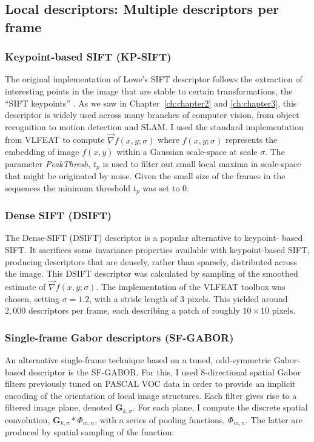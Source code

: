 \subsection{Local descriptors: Multiple descriptors per frame}
\label{sec:descriptors}

\subsubsection{Keypoint-based SIFT (KP-SIFT)}

The original implementation of Lowe's SIFT descriptor follows the extraction of interesting points in the image that are stable to certain transformations, the ``SIFT keypoints'' \cite{lowe2004distinctive}. As we saw in Chapter~\ref{ch:chapter2} and \ref{ch:chapter3}, this descriptor is widely used across many branches of computer vision, from object recognition to motion detection and SLAM. I used the standard implementation from VLFEAT \cite{Vedaldi2008} to compute $\vec{\nabla}f(x,y;\sigma)$ where $f(x,y;\sigma)$ represents the embedding of image $f(x,y)$ within a Gaussian scale-space at scale $\sigma$. The parameter \emph{PeakThresh}, $t_p$ is used to filter out small local maxima in scale-space that might be originated by noise. Given the small size of the frames in the sequences the minimum threshold $t_p$ was set to $0$.

\subsubsection{Dense SIFT (DSIFT)}

The Dense-SIFT (DSIFT) descriptor \citep{Lazebnik2006} is a popular  alternative to keypoint- based SIFT. It sacrifices some invariance properties available with keypoint-based SIFT, producing descriptors that are densely, rather than sparsely, distributed across the image. This DSIFT descriptor was calculated by  sampling of the smoothed estimate of $\vec{\nabla}f(x,y;\sigma)$.  The implementation of the VLFEAT toolbox was chosen, setting $\sigma = 1.2$, with a stride length of 3 pixels. This  yielded around $2,000$ descriptors per frame, each describing a patch of roughly $10 \times 10$ pixels.

\subsubsection{Single-frame Gabor descriptors (SF-GABOR)}
\label{sec:sf-gabor}

An alternative single-frame technique based on a tuned, odd-symmetric Gabor-based descriptor is the SF-GABOR. For this, I used 8-directional spatial Gabor filters previously tuned on PASCAL VOC data \cite{everingham2010pascal} in order to provide an implicit encoding of the orientation of local image structures.  Each filter gives rise to a filtered image plane, denoted $\mathbf{G}_{k,\sigma}$.  For each plane, I compute the discrete spatial convolution, $\mathbf{G}_{k,\sigma} \ast {\Phi}_{m,n}$, with a series of pooling functions, ${\Phi}_{m,n}$. The latter are produced by spatial sampling of the function:

